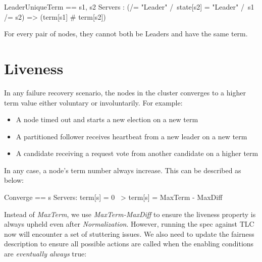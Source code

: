 \begin{tla}
LeaderUniqueTerm ==
    \A s1, s2 \in Servers :
        (/\state[s1] = "Leader" 
         /\ state[s2] = "Leader" 
         /\ s1 /= s2)   
            => (term[s1] # term[s2])
\end{tla}
\begin{tlatex}
%
%
%
%
%
%
\end{tlatex}
\newline

For every pair of nodes, they cannot both be Leaders and have the same
term.

\section{Liveness}

In any failure recovery scenario, the nodes in the cluster converges to a higher
term value either voluntary or involuntarily. For example: 
\begin{itemize}
    \item A node timed out and starts a new election on a new term 
    \item A partitioned follower receives heartbeat from a new leader on a new term
    \item A candidate receiving a request vote from another candidate on a higher term
\end{itemize}

In any case, a node's term number always increase. This can be described as below:\newline
\begin{tla}
Converge ==
    \A s \in Servers:
        term[s] = 0 ~> term[s] = MaxTerm - MaxDiff
\end{tla}
\begin{tlatex}
%
%
\end{tlatex}
\newline

Instead of \textit{MaxTerm}, we use \textit{MaxTerm-MaxDiff} to ensure the
liveness property is always upheld even after \textit{Normalization}. However,
running the spec against TLC now will encounter a set of stuttering issues. We
also need to update the fairness description to ensure all possible actions are
called when the enabling conditions are \textit{eventually always} true:\newline

